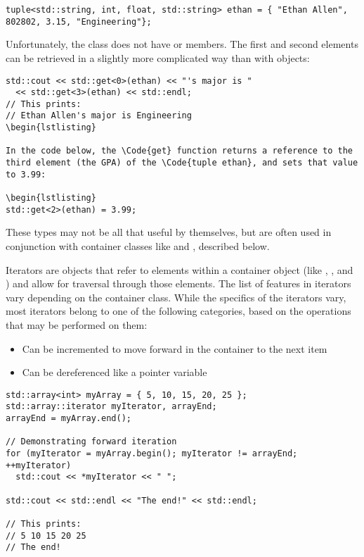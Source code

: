 \begin{lstlisting}
tuple<std::string, int, float, std::string> ethan = { "Ethan Allen", 802802, 3.15, "Engineering"};
\end{lstlisting}

Unfortunately, the  class does not have  or  members. 
The first and second elements can be retrieved in a slightly more complicated way than with  objects:

\begin{lstlisting}
std::cout << std::get<0>(ethan) << "'s major is " 
  << std::get<3>(ethan) << std::endl;
// This prints:
// Ethan Allen's major is Engineering
\begin{lstlisting}

In the code below, the \Code{get} function returns a reference to the third element (the GPA) of the \Code{tuple ethan}, and sets that value to 3.99:

\begin{lstlisting}
std::get<2>(ethan) = 3.99;
\end{lstlisting}

These types may not be all that useful by themselves, but are often used in conjunction with container classes like  and , described below.


Iterators are objects that refer to elements within a container object (like , , and ) and allow for traversal through those elements. 
The list of features in iterators vary depending on the container class. 
While the specifics of the iterators vary, most iterators belong to one of the following categories, based on the operations that may be performed on them:


\begin{itemize}
	\item Can be incremented to move forward in the container to the next item
	\item Can be dereferenced like a pointer variable
\end{itemize}

\begin{lstlisting}
std::array<int> myArray = { 5, 10, 15, 20, 25 };
std::array::iterator myIterator, arrayEnd;
arrayEnd = myArray.end();

// Demonstrating forward iteration
for (myIterator = myArray.begin(); myIterator != arrayEnd; ++myIterator)
  std::cout << *myIterator << " ";

std::cout << std::endl << "The end!" << std::endl;

// This prints:
// 5 10 15 20 25
// The end!
\end{lstlisting}

